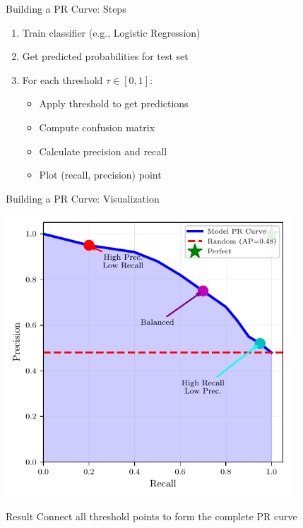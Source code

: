\documentclass{beamer}
\begin{document}
\begin{frame}{Building a PR Curve: Steps}
\begin{enumerate}
    \item Train classifier (e.g., Logistic Regression)

    \vspace{0.15cm}

    \item Get predicted probabilities for test set

    \vspace{0.15cm}

    \item For each threshold $\tau \in [0, 1]$:
    \begin{itemize}
        \item Apply threshold to get predictions
        \item Compute confusion matrix
        \item Calculate precision and recall
        \item Plot (recall, precision) point
    \end{itemize}
\end{enumerate}
\end{frame}

\begin{frame}{Building a PR Curve: Visualization}
\begin{center}
\includegraphics[width=0.8\textwidth]{pr-curve-diagram.pdf}
\end{center}

\vspace{0.15cm}

\begin{keypointsbox}{Result}
\small
Connect all threshold points to form the complete PR curve
\end{keypointsbox}
\end{frame}
\end{document}
